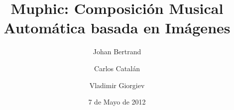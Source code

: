 \documentclass[11pt]{article}
\begin{document}
\title{Muphic: Composición Musical Automática basada en Imágenes} %
\author{Johan Bertrand \and Carlos Catalán \and Vladimir Giorgiev}
\date{7 de Mayo de 2012}
\maketitle

\tableofcontents
\newpage








\end{document}
